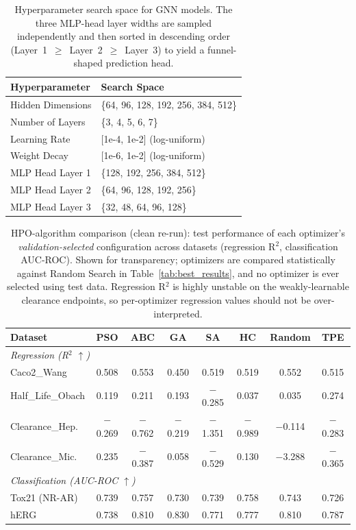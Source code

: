 \documentclass[journal,onecolumn]{IEEEtran}
\begin{document}
\begin{table}[H]
\centering
\caption{Hyperparameter search space for GNN models. The three MLP-head layer widths are sampled independently and then sorted in descending order (Layer~1~$\geq$~Layer~2~$\geq$~Layer~3) to yield a funnel-shaped prediction head.}
\label{tab:search_space}
\small
\begin{tabular}{ll}
\toprule
\textbf{Hyperparameter} & \textbf{Search Space} \\
\midrule
Hidden Dimensions & \{64, 96, 128, 192, 256, 384, 512\} \\
Number of Layers & \{3, 4, 5, 6, 7\} \\
Learning Rate & [1e-4, 1e-2] (log-uniform) \\
Weight Decay & [1e-6, 1e-2] (log-uniform) \\
MLP Head Layer 1 & \{128, 192, 256, 384, 512\} \\
MLP Head Layer 2 & \{64, 96, 128, 192, 256\} \\
MLP Head Layer 3 & \{32, 48, 64, 96, 128\} \\
\bottomrule
\end{tabular}
\end{table}

\begin{table}[!t]
\centering
\caption{HPO-algorithm comparison (clean re-run): test performance of each optimizer's \emph{validation-selected} configuration across datasets (regression R$^2$, classification AUC-ROC). Shown for transparency; optimizers are compared statistically against Random Search in Table~\ref{tab:best_results}, and no optimizer is ever selected using test data. Regression R$^2$ is highly unstable on the weakly-learnable clearance endpoints, so per-optimizer regression values should not be over-interpreted.}
\label{tab:hpo_results}
\scriptsize
\begin{tabular}{lccccccc}
\toprule
\textbf{Dataset} & \textbf{PSO} & \textbf{ABC} & \textbf{GA} & \textbf{SA} & \textbf{HC} & \textbf{Random} & \textbf{TPE} \\
\midrule
\multicolumn{8}{l}{\emph{Regression (R$^2$ $\uparrow$)}} \\
\midrule
Caco2\_Wang & 0.508 & 0.553 & 0.450 & 0.519 & 0.519 & 0.552 & 0.515 \\
Half\_Life\_Obach & 0.119 & 0.211 & 0.193 & $-$0.285 & 0.037 & 0.035 & 0.274 \\
Clearance\_Hep. & $-$0.269 & $-$0.762 & $-$0.219 & $-$1.351 & $-$0.989 & $-$0.114 & $-$0.283 \\
Clearance\_Mic. & 0.235 & $-$0.387 & 0.058 & $-$0.529 & 0.130 & $-$3.288 & $-$0.365 \\
\midrule
\multicolumn{8}{l}{\emph{Classification (AUC-ROC $\uparrow$)}} \\
\midrule
Tox21 (NR-AR) & 0.739 & 0.757 & 0.730 & 0.739 & 0.758 & 0.743 & 0.726 \\
hERG & 0.738 & 0.810 & 0.830 & 0.771 & 0.777 & 0.810 & 0.787 \\
\bottomrule
\end{tabular}
\end{table}
\end{document}
